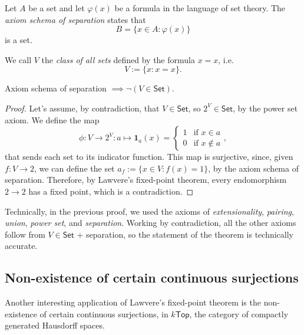 \begin{definition}
    Let $A$ be a set and let $\varphi(x)$ be a formula in the language of set theory. The \emph{axiom schema of separation} states that
    \[ B = \{ x \in A : \varphi(x) \} \]
    is a set.
\end{definition}

\begin{definition}
    We call $V$ the \emph{class of all sets} defined by the formula $x = x$, i.e.
    \[ V := \{ x : x = x \}. \]
\end{definition}

\begin{theorem}
    Axiom schema of separation $\implies \neg(V \in \mathsf{Set})$.
\end{theorem}

\begin{proof}
    Let's assume, by contradiction, that $V \in \mathsf{Set}$, so $2^V \in \mathsf{Set}$, by the power set axiom.
    We define the map
    \[ \phi : V \to 2^V : a \mapsto \mathbf 1_a(x) = \begin{cases}
        1 & \text{if $x \in a$} \\
        0 & \text{if $x \notin a$}
    \end{cases},\]
    that sends each set to its indicator function. This map is surjective, since, given $f : V \to 2$, we can define the set $a_f := \{ x \in V : f(x) = 1 \}$, by the axiom schema of separation.
    Therefore, by Lawvere's fixed-point theorem, every endomorphism $2 \to 2$ has a fixed point, which is a contradiction.
\end{proof}

\begin{remark}
    Technically, in the previous proof, we used the axioms of \emph{extensionality}, \emph{pairing}, \emph{union}, \emph{power set}, and \emph{separation}.
    Working by contradiction, all the other axioms follow from $V \in \mathsf{Set}$ + separation, so the statement of the theorem is technically accurate.
\end{remark}

\subsection*{Non-existence of certain continuous surjections}
Another interesting application of Lawvere's fixed-point theorem is the non-existence of certain continuous surjections, in $k\mathsf{Top}$, the category of compactly generated Hausdorff spaces.


